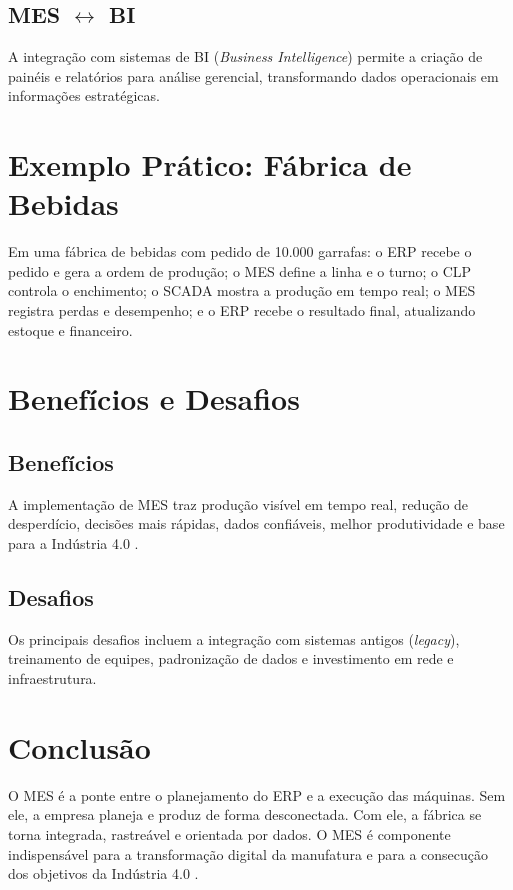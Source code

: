 \documentclass[12pt,a4paper,oneside]{article}
\begin{document}
\subsection{MES $\leftrightarrow$ BI}

A integração com sistemas de BI (\textit{Business Intelligence}) permite a criação de painéis e relatórios para análise gerencial, transformando dados operacionais em informações estratégicas.

\section{Exemplo Prático: Fábrica de Bebidas}

Em uma fábrica de bebidas com pedido de 10.000 garrafas: o ERP recebe o pedido e gera a ordem de produção; o MES define a linha e o turno; o CLP controla o enchimento; o SCADA mostra a produção em tempo real; o MES registra perdas e desempenho; e o ERP recebe o resultado final, atualizando estoque e financeiro.

\section{Benefícios e Desafios}

\subsection{Benefícios}

A implementação de MES traz produção visível em tempo real, redução de desperdício, decisões mais rápidas, dados confiáveis, melhor produtividade e base para a Indústria 4.0 \cite{schwab2016}.

\subsection{Desafios}

Os principais desafios incluem a integração com sistemas antigos (\textit{legacy}), treinamento de equipes, padronização de dados e investimento em rede e infraestrutura.

\section{Conclusão}

O MES é a ponte entre o planejamento do ERP e a execução das máquinas. Sem ele, a empresa planeja e produz de forma desconectada. Com ele, a fábrica se torna integrada, rastreável e orientada por dados. O MES é componente indispensável para a transformação digital da manufatura e para a consecução dos objetivos da Indústria 4.0 \cite{santos2024}.



\end{document}
